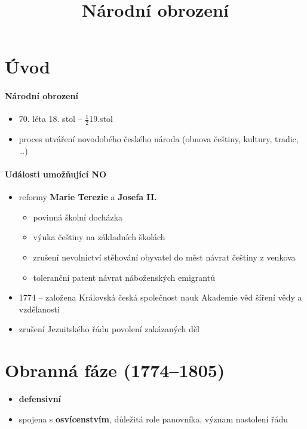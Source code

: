 \title{Národní obrození}


\section*{Úvod}
\paragraph{Národní obrození}
\begin{itemize}
\item 70. léta 18. stol -- $\frac{1}{2}$19.stol
\item proces utváření novodobého českého národa (obnova češtiny, kultury, tradic, \ldots)
\end{itemize}
\paragraph{Události umožňující NO}
\begin{itemize}
\item reformy \textbf{Marie Terezie} a \textbf{Josefa II.}
	\begin{itemize}
	\item povinná školní docházka
	\item výuka češtiny na základních školách
	\item zrušení nevolnictví \ra stěhování obyvatel do měst \ra návrat češtiny z venkova
	\item toleranční patent \ra návrat náboženských emigrantů
	\end{itemize}
\item 1774 -- založena Královská česká společnost nauk \ra Akademie věd \ra šíření vědy a vzdělanosti
\item zrušení Jezuitského řádu \ra povolení zakázaných děl
\end{itemize}

\section{Obranná fáze (1774--1805)}
\begin{itemize}
\item \textbf{defensivní}
\item spojena s \textbf{osvícenstvím}, důležitá role panovníka, význam nastolení řádu
\end{itemize}


